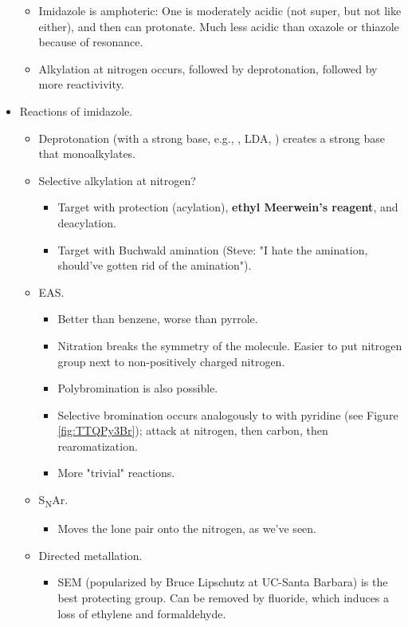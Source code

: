 \documentclass[../notes.tex]{subfiles}
\begin{document}
\begin{itemize}
\begin{itemize}
        \item Imidazole is amphoteric: One  is moderately acidic (not super, but not like  either), and then can protonate. Much less acidic than oxazole or thiazole because of resonance.
        \item Alkylation at nitrogen occurs, followed by deprotonation, followed by more reactivivity.
    \end{itemize}
    \item Reactions of imidazole.
    \begin{itemize}
        \item Deprotonation (with a strong base, e.g., , LDA, ) creates a strong base that monoalkylates.
        \item Selective alkylation at nitrogen?
        \begin{itemize}
            \item Target  with protection (acylation), \textbf{ethyl Meerwein's reagent}, and deacylation.
            \item Target  with Buchwald amination (Steve: "I hate the amination, should've gotten rid of the amination").
        \end{itemize}
        \item EAS.
        \begin{itemize}
            \item Better than benzene, worse than pyrrole.
            \item Nitration breaks the symmetry of the molecule. Easier to put nitrogen group next to non-positively charged nitrogen.
            \item Polybromination is also possible.
            \item Selective bromination occurs analogously to with pyridine (see Figure \ref{fig:TTQPy3Br}); attack at nitrogen, then carbon, then rearomatization.
            \item More "trivial" reactions.
        \end{itemize}
        \item S\textsubscript{N}Ar.
        \begin{itemize}
            \item Moves the lone pair onto the nitrogen, as we've seen.
        \end{itemize}
        \item Directed metallation.
        \begin{itemize}
            \item SEM (popularized by Bruce Lipschutz at UC-Santa Barbara) is the best protecting group. Can be removed by fluoride, which induces a loss of ethylene and formaldehyde.

\end{itemize}
\end{itemize}
\end{itemize}
\end{document}
